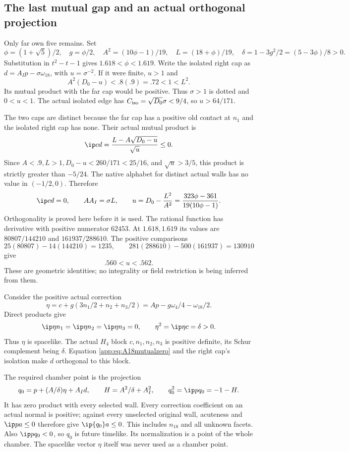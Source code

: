 \subsection{The last mutual gap and an actual orthogonal projection}
\label{app:A18jointpoint}
Only far own five remains. Set
\[
 \phi=(1+\sqrt5)/2,\quad g=\phi/2,\quad
 A^2=(10\phi-1)/19,\quad L=(18+\phi)/19,\quad
 \delta=1-3g^2/2=(5-3\phi)/8>0.
\]
Substitution in \(t^2-t-1\) gives \(1.618<\phi<1.619\).
Write the isolated right cap as
\(d=A_Ip-\sigma\omega_{18}\), with \(u=\sigma^{-2}\).
If it were finite, \(u>1\) and
\[
 A^2(D_0-u)<.8(.9)=.72<1<L^2 .
\]
Its mutual product with the far cap would be positive.
Thus \(\sigma>1\) is dotted and \(0<u<1\).
The actual isolated edge has \(C_{\rm iso}=\sqrt{D_0}\sigma<9/4\),
so \(u>64/171\).

The two caps are distinct because the far cap has a positive old
contact at \(n_1\) and the isolated right cap has none.
Their actual mutual product is
\[
 \ip cd=\frac{L-A\sqrt{D_0-u}}{\sqrt u}\leq0.
\]
Since \(A<.9,L>1,D_0-u<260/171<25/16\), and
\(\sqrt u>3/5\), this product is strictly greater than \(-5/24\).
The native alphabet for distinct actual walls has no value in
\((-1/2,0)\). Therefore
\begin{equation}\label{app:eq:A18mutualzero}
 \ip cd=0,\qquad
 AA_I=\sigma L,\qquad
 u=D_0-\frac{L^2}{A^2}
   =\frac{323\phi-361}{19(10\phi-1)}.
\end{equation}
Orthogonality is proved here before it is used.
The rational function has derivative with positive numerator
\(62453\). At \(1.618,1.619\) its values are
\(80807/144210\) and \(161937/288610\).
The positive comparisons
\[
 25(80807)-14(144210)=1235,\qquad
 281(288610)-500(161937)=130910
\]
give
\begin{equation}\label{app:eq:A18uinterval}
 .560<u<.562 .
\end{equation}
These are geometric identities; no integrality or field restriction
is being inferred from them.

Consider the positive actual correction
\[
 \eta=c+g(3n_1/2+n_2+n_3/2)
      =A p-g\omega_4/4-\omega_{18}/2 .
\]
Direct products give
\[
 \ip\eta{n_1}=\ip\eta{n_2}=\ip\eta{n_3}=0,\qquad
 \eta^2=\ip\eta c=\delta>0.
\]
Thus \(\eta\) is spacelike. The actual \(H_4\) block
\(c,n_1,n_2,n_3\) is positive definite, its Schur complement being
\(\delta\). Equation \eqref{app:eq:A18mutualzero} and the right
cap's isolation make \(d\) orthogonal to this block.

The required chamber point is the projection
\[
 q_0=p+(A/\delta)\eta+A_Id,\qquad
 H=A^2/\delta+A_I^2,\qquad
 q_0^2=\ip p{q_0}=-1-H .
\]
It has zero product with every selected wall. Every correction
coefficient on an actual normal is positive; against every
unselected original wall, acuteness and \(\ip p a\leq0\)
therefore give \(\ip{q_0}a\leq0\). This includes \(n_{18}\)
and all unknown facets. Also \(\ip p{q_0}<0\), so \(q_0\) is
future timelike. Its normalization is a point of the whole
chamber. The spacelike vector \(\eta\) itself was never used
as a chamber point.

